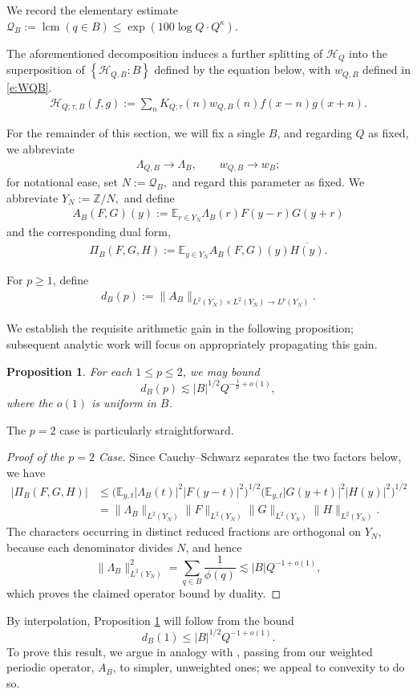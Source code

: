 \documentclass[12pt,leqno]{amsart}
\numberwithin{equation}{section}
\newtheorem{proposition}[equation]{Proposition}
\theoremstyle{definition}
\theoremstyle{plain}
\begin{document}
	We record the elementary estimate  $\mathcal{Q}_B:= \operatorname{lcm}\left(q \in B \right) \leq \exp(100 \log Q \cdot Q^\kappa).$
	
	The aforementioned decomposition induces a further splitting of $\mathcal{H}_Q$ into the superposition of  $\left\{\mathcal{H}_{Q,B} : B\right\}$ defined by the equation below, with $w_{Q,B}$ defined in \eqref{e:WQB}. 
	\begin{align}
		\mathcal{H}_{Q;\tau,B}(f,g) :=  \sum_n K_{Q;\tau}(n) w_{Q,B}(n) f(x-n) g(x+n).
	\end{align}
	
	For the remainder of this section, we will fix a single $B$, and regarding $Q$ as fixed, we abbreviate
	\begin{align}
		\Lambda_{Q,B} \longrightarrow \Lambda_B, \qquad w_{Q,B} \longrightarrow w_B;
	\end{align}
	for notational ease, set $   N := \mathcal{Q}_B,$ and regard this parameter as fixed. We abbreviate $Y_N := \mathbb{Z}/N,$ and define
	\begin{align}
		A_B(F,G)(y) := \mathbb{E}_{r \in Y_N} \Lambda_B(r) F(y-r) G(y+r)
	\end{align}
	and the corresponding dual form,
	\begin{align}
		\Pi_B(F,G,H) := \mathbb{E}_{y \in Y_N} A_B(F,G)(y) \overline{H(y)}.    
	\end{align}
	
	For $ p \geq 1$, define
	\begin{align}
		d_B(p) := \| A_B \|_{L^2(Y_N) \times L^2(Y_N) \to L^p(Y_N)}.
	\end{align}
	
	We establish the requisite arithmetic gain in the following proposition; subsequent analytic work will focus on appropriately propagating this gain.
	\begin{proposition}\label{p:interpsetup}
		For each $1 \leq p \leq 2$, we may bound
		\[ d_B(p) \lesssim |B|^{1/2} Q^{-\frac{1}{p}+o(1)}, \]
		where the $o(1)$ is uniform in $B$.
	\end{proposition}
	The $p=2$ case is particularly straightforward.
	\begin{proof}[Proof of the $p=2$ Case]
		Since Cauchy--Schwarz separates the two factors below, we have
		\begin{align*}
			|\Pi_B(F,G,H)|
			&\leq\big(\mathbb E_{y,t}|\Lambda_B(t)|^2|F(y-t)|^2\big)^{1/2}
			\big(\mathbb E_{y,t}|G(y+t)|^2|H(y)|^2\big)^{1/2}\\
			&=\|\Lambda_B\|_{L^2(Y_N)}
			\|F\|_{L^2(Y_N)}\|G\|_{L^2(Y_N)}\|H\|_{L^2(Y_N)}.
		\end{align*}
		The characters occurring in distinct reduced fractions are orthogonal
		on $Y_N$, because each denominator divides $N$, and hence
		\[
		\|\Lambda_B\|_{L^2(Y_N)}^2
		=\sum_{q\in B}\frac1{\phi(q)}\lesssim |B|Q^{-1+o(1)},
		\]
		which proves the claimed operator bound by duality.
	\end{proof}
	By interpolation, Proposition \ref{p:interpsetup} will follow from the bound 
	\[ d_B(1) \leq |B|^{1/2} Q^{-1 + o(1)}. \]
	To prove this result, we argue in analogy with \cite{FKMS26}, passing from our weighted periodic operator, $A_B$, to simpler, unweighted ones; we appeal to convexity to do so. 
	
\end{document}
